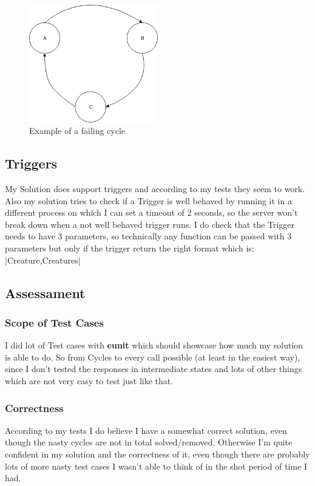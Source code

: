 \documentclass[11pt,a4paper]{article}
\begin{document}
\begin{figure}[!htb]
	\center
	\includegraphics[width=0.5\textwidth]{images/fail_cycle}
	\caption{Example of a failing cycle}
\end{figure}


\subsection{Triggers}
My Solution does support triggers and according to my tests they seem to work.
Also my solution tries to check if a Trigger is well behaved by running it in a different process on which I can set a timeout of 2 seconds, so the server won't break down when a not well behaved trigger runs.
I do check that the Trigger needs to have 3 parameters, so technically any function can be passed with 3 parameters but only if the trigger return the right format which is: |{Creature,Creatures}|




\subsection{Assessament}
\subsubsection{Scope of Test Cases}
I did lot of Test cases with \textbf{eunit} which should showcase how much my solution is able to do.
So from Cycles to every call possible (at least in the easiest way), since I don't tested the responses in intermediate states and lots of other things which are not very easy to test just like that.
\subsubsection{Correctness}
According to my tests I do believe I have a somewhat correct solution, even though the nasty cycles are not in total solved/removed.
Otherwise I'm quite confident in my solution and the correctness of it, even though there are probably lots of more nasty test cases I wasn't able to think of in the shot period of time I had.
\end{document}
